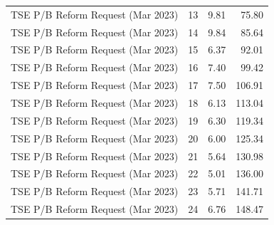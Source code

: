 \begin{table}
\begin{tabular}{lrrr}
TSE P/B Reform Request (Mar 2023) & 13 & 9.81 & 75.80 \\
TSE P/B Reform Request (Mar 2023) & 14 & 9.84 & 85.64 \\
TSE P/B Reform Request (Mar 2023) & 15 & 6.37 & 92.01 \\
TSE P/B Reform Request (Mar 2023) & 16 & 7.40 & 99.42 \\
TSE P/B Reform Request (Mar 2023) & 17 & 7.50 & 106.91 \\
TSE P/B Reform Request (Mar 2023) & 18 & 6.13 & 113.04 \\
TSE P/B Reform Request (Mar 2023) & 19 & 6.30 & 119.34 \\
TSE P/B Reform Request (Mar 2023) & 20 & 6.00 & 125.34 \\
TSE P/B Reform Request (Mar 2023) & 21 & 5.64 & 130.98 \\
TSE P/B Reform Request (Mar 2023) & 22 & 5.01 & 136.00 \\
TSE P/B Reform Request (Mar 2023) & 23 & 5.71 & 141.71 \\
TSE P/B Reform Request (Mar 2023) & 24 & 6.76 & 148.47 \\
\bottomrule
\end{tabular}
\end{table}

